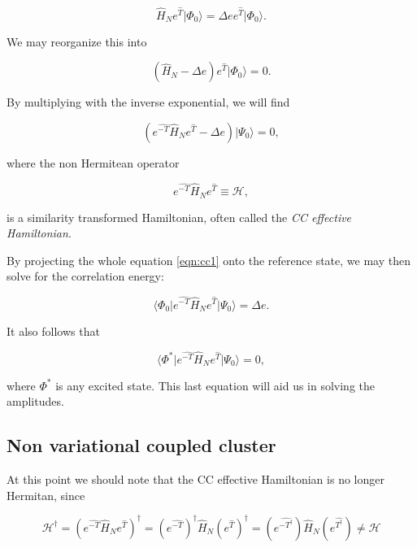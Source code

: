 \begin{equation}
\hat{H}_N e^{\hat{T}} \vert \Phi_0 \rangle =  \Delta e  e^{\hat{T}} \vert \Phi_0 \rangle.
\end{equation}

We may reorganize this into

\begin{equation}
(\hat{H}_N - \Delta e) e^{\hat{T}} \vert \Phi_0 \rangle = 0.
\end{equation}

By multiplying with the inverse exponential, we will find

\begin{equation}
(e^{\hat{-T}} \hat{H}_N e^{\hat{T}} - \Delta e)  \vert \Psi_0 \rangle = 0,
\label{eqn:cc1}
\end{equation}

where the non Hermitean operator

\begin{equation}
e^{\hat{-T}} \hat{H}_N e^{\hat{T}}  \equiv \mathcal{H},
\end{equation}

is a similarity transformed Hamiltonian, often called the \emph{CC effective Hamiltonian}.

By projecting the whole equation \ref{eqn:cc1} onto the reference state, we may then solve for the correlation energy:

\begin{equation}
\langle \Phi_0 \vert e^{\hat{-T}} \hat{H}_N e^{\hat{T}} \vert \Psi_0 \rangle = \Delta e.
\label{eqn:cc2}
\end{equation}

It also follows that

\begin{equation}
\langle \Phi^* \vert e^{\hat{-T}} \hat{H}_N e^{\hat{T}} \vert \Psi_0 \rangle = 0,
\label{eqn:cc2}
\end{equation}

where $\Phi^*$ is any excited state. This last equation will aid us in solving the amplitudes.

\subsection{Non variational coupled cluster}

At this point we should note that the CC effective Hamiltonian is no longer Hermitan, since

\begin{equation}
\mathcal{H}^\dagger = (e^{\hat{-T}} \hat{H}_N e^{\hat{T}})^\dagger = (e^{\hat{-T}})^\dagger \hat{H}_N (e^{\hat{T}})^\dagger = (e^{\hat{-T^\dagger}}) \hat{H}_N (e^{\hat{T^\dagger}}) \neq \mathcal{H}
\end{equation}

